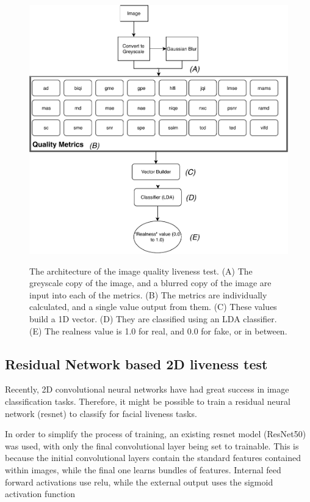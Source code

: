 \documentclass[10pt,a4paper]{article}
\begin{document}
        \begin{figure}
            \centering
            \includegraphics[width=\linewidth]{ImageQualityLivenessTest.pdf}
            \label{ImageQualityLivenessTestDiagram}
            \caption{The architecture of the image quality liveness test. (A) The greyscale copy of the image, and a blurred copy of the image are input into each of the metrics.
            (B) The metrics are individually calculated, and a single value output from them. (C) These values build a 1D vector. (D) They are classified using an LDA classifier. (E) The realness value
            is 1.0 for real, and 0.0 for fake, or in between.}
        \end{figure}


    \subsection{Residual Network based 2D liveness test}
        Recently, 2D convolutional neural networks have had great success in image classification tasks. Therefore, it might be possible to train
        a residual neural network (resnet) to classify for facial liveness tasks.

        In order to simplify the process of training, an existing resnet model (ResNet50) was used, with only the final convolutional layer being
        set to trainable. This is because the initial convolutional layers contain the standard features contained within images, while the final one
        learns bundles of features. Internal feed forward activations use relu, while the external output uses the sigmoid activation function
\end{document}
